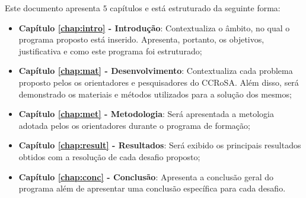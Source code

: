 Este documento apresenta $5$ capítulos e está estruturado da seguinte forma:

\begin{itemize}

  \item \textbf{Capítulo \ref{chap:intro} - Introdução}: Contextualiza o âmbito, no qual o programa proposto está inserido. Apresenta, portanto, os objetivos, justificativa e como este programa foi estruturado;
  \item \textbf{Capítulo \ref{chap:mat} - Desenvolvimento}: Contextualiza cada problema proposto pelos os orientadores e pesquisadores do CCRoSA. Além disso, será demonstrado os materiais e métodos utilizados para a solução dos mesmos;
  \item \textbf{Capítulo \ref{chap:met} - Metodologia}: Será apresentada a metologia adotada pelos os orientadores durante o programa de formação;  
  \item \textbf{Capítulo \ref{chap:result} - Resultados}: Será exibido os principais resultados obtidos com a resolução de cada desafio proposto;
  \item \textbf{Capítulo \ref{chap:conc} - Conclusão}: Apresenta a conclusão geral do programa além de apresentar uma conclusão específica para cada desafio.

\end{itemize}
